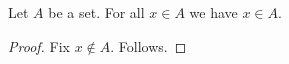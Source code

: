 \begin{proposition}\label{invalid_bounded_fix}
    Let $A$ be a set.
    For all $x\in A$ we have $x\in A$.
\end{proposition}
\begin{proof}
    Fix $x\notin A$.
    Follows.
\end{proof}

